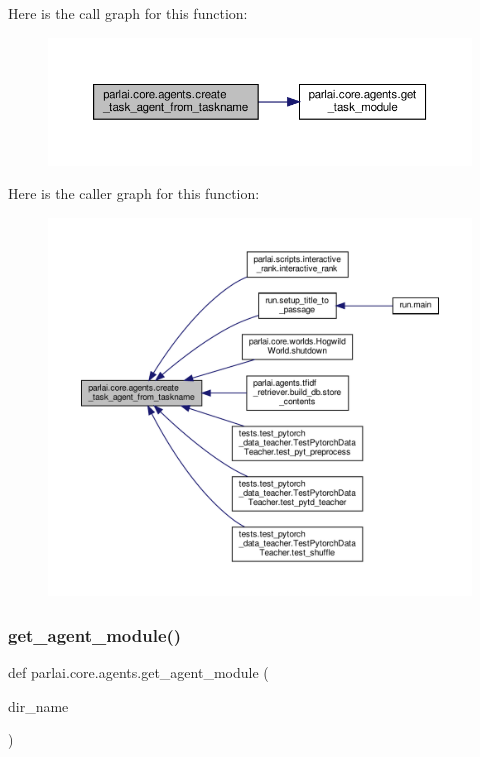 Here is the call graph for this function\+:
\nopagebreak
\begin{figure}[H]
\begin{center}
\leavevmode
\includegraphics[width=350pt]{namespaceparlai_1_1core_1_1agents_ab4473fa54af02b5ab385b41b51dacd10_cgraph}
\end{center}
\end{figure}
Here is the caller graph for this function\+:
\nopagebreak
\begin{figure}[H]
\begin{center}
\leavevmode
\includegraphics[width=350pt]{namespaceparlai_1_1core_1_1agents_ab4473fa54af02b5ab385b41b51dacd10_icgraph}
\end{center}
\end{figure}
\mbox{\label{namespaceparlai_1_1core_1_1agents_a14a9d134d76ffd0509e50703d0f2c949}} 
\subsubsection{\texorpdfstring{get\+\_\+agent\+\_\+module()}{get\_agent\_module()}}
{\footnotesize\ttfamily def parlai.\+core.\+agents.\+get\+\_\+agent\+\_\+module (\begin{DoxyParamCaption}\item[{}]{dir\+\_\+name }\end{DoxyParamCaption})}

